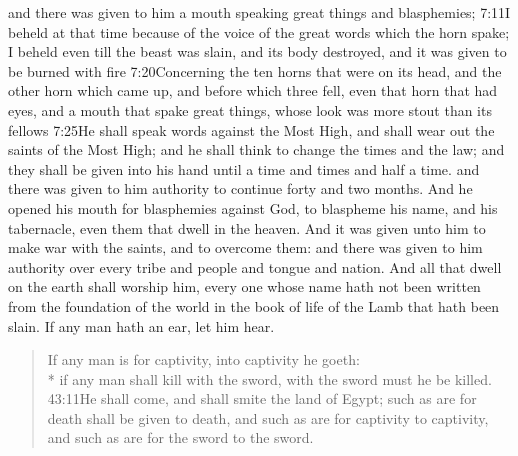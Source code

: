 and there was given to him a mouth speaking great things and blasphemies;%
				       {7:11}{I beheld at that time because of the voice of the great words which the horn spake; I beheld even till the beast was slain, and its body destroyed, and it was given to be burned with fire}%
					   {7:20}{Concerning the ten horns that were on its head, and the other horn which came up, and before which three fell, even that horn that had eyes, and a mouth that spake great things, whose look was more stout than its fellows}
					   {7:25}{He shall speak words against the Most High, and shall wear out the saints of the Most High; and he shall think to change the times and the law; and they shall be given into his hand until a time and times and half a time.} %
and there was given to him authority to continue forty and two months. 
And he opened his mouth for blasphemies against God, to blaspheme his name, and his tabernacle, even them that dwell in the heaven.%
And it was given unto him to make war with the saints, and to overcome them: and there was given to him authority over every tribe and people and tongue and nation. 
And all that dwell on the earth shall worship him, every one whose name hath not been written from the foundation of the world in the book of life%
of the Lamb that hath been slain. 
If any man hath an ear, let him hear. 
\begin{verse}
If any man is for captivity, into captivity he goeth:\\* if any man shall kill with the sword, with the sword must he be killed.%
					{43:11}{He shall come, and shall smite the land of Egypt; such as are for death shall be given to death, and such as are for captivity to captivity, and such as are for the sword to the sword.}%
\end{verse}

